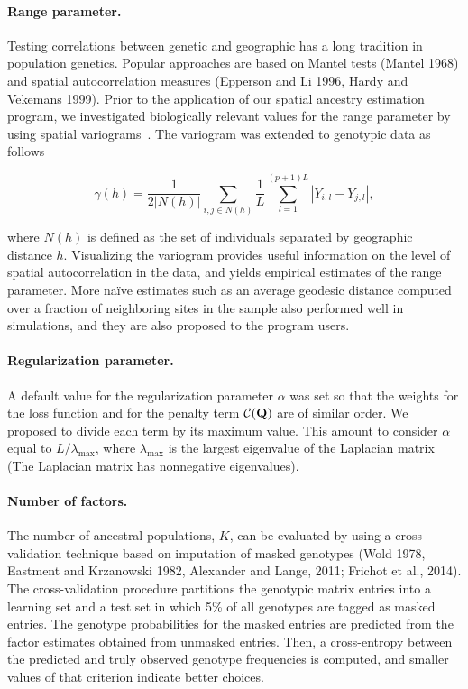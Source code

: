 \paragraph{Range parameter.} Testing correlations between genetic and geographic
has a long tradition in population genetics. Popular approaches are based on
Mantel tests (Mantel 1968) and spatial autocorrelation measures (Epperson and Li
1996, Hardy and Vekemans 1999). Prior to the application of our spatial ancestry
estimation program, we investigated biologically relevant values for the range
parameter by using spatial variograms~\citep{Cressie1993}. The variogram was
extended to genotypic data as follows

\begin{equation}
\gamma(h) = \frac{1}{2 |N(h)|} \sum_{i,j \in N(h)} \frac{1}{L} \sum_{l = 1}^{(p+1)L} |Y_{i,l} - Y_{j,l}|,
\label{eq:gamma}
\end{equation}

where $N(h)$ is defined as the set of individuals separated by geographic
distance $h$. Visualizing the variogram provides useful information on the level
of spatial autocorrelation in the data, and yields empirical estimates of the
range parameter. More naïve estimates such as an average geodesic distance
computed over a fraction of neighboring sites in the sample also performed well
in simulations, and they are also proposed to the program users.

\paragraph{Regularization parameter.} A default value for the regularization
parameter $\alpha$ was set so that the weights for the loss function and for
the penalty term ${\cal C}({\bf Q})$ are of similar order. We proposed to divide
each term by its maximum value. This amount to consider $\alpha$ equal to $L /
\lambda_\max$, where $\lambda_\max$ is the largest eigenvalue of the Laplacian
matrix (The Laplacian matrix has nonnegative eigenvalues).

\paragraph{Number of factors.} The number of ancestral populations, $K$, can be
evaluated by using a cross-validation technique based on imputation of masked
genotypes (Wold 1978, Eastment and Krzanowski 1982, Alexander and Lange, 2011;
Frichot et al., 2014). The cross-validation
procedure partitions the genotypic matrix entries into a learning set and a test
set in which 5\% of all genotypes are tagged as masked entries. The genotype
probabilities for the masked entries are predicted from the factor estimates
obtained from unmasked entries. Then, a cross-entropy between the predicted and
truly observed genotype frequencies is computed, and smaller values of that
criterion indicate better choices. 

